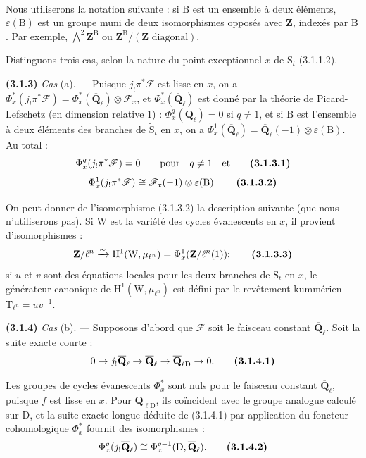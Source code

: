 \documentclass[11pt,leqno]{article}
\newcommand{\Page}[1]{\ifvmode\noindent\else\unskip\ \fi{\footnotesize\textcolor{gray}{[p.\,#1]}}\ \ignorespaces}
\begin{document}
\Page{199}

Nous utiliserons la notation suivante : si \(\mathrm B\) est un ensemble à deux éléments, \(\varepsilon(\mathrm B)\) est un groupe muni de deux isomorphismes opposés avec \(\mathbf Z\), indexés par \(\mathrm B\). Par exemple, \(\bigwedge\limits^{2}\mathbf Z^{\mathrm B}\) ou \(\mathbf Z^{\mathrm B}/(\mathbf Z\text{ diagonal})\).

Distinguons trois cas, selon la nature du point exceptionnel \(x\) de \(\mathrm S_t\) (3.1.1.2).

\textbf{(3.1.3)} \textit{Cas} (a). — Puisque \(j_!\pi^*\mathscr F\) est lisse en \(x\), on a \(\Phi_x^*(j_!\pi^*\mathscr F)=\Phi_x^*(\overline{\mathbf Q}_\ell)\otimes\mathscr F_x\), et \(\Phi_x^*(\overline{\mathbf Q}_\ell)\) est donné par la théorie de Picard-Lefschetz (en dimension relative \(1\)) : \(\Phi_x^q(\overline{\mathbf Q}_\ell)=0\) si \(q\ne1\), et si \(\mathrm B\) est l’ensemble à deux éléments des branches de \(\widetilde{\mathrm S}_t\) en \(x\), on a \(\Phi_x^1(\overline{\mathbf Q}_\ell)=\overline{\mathbf Q}_\ell(-1)\otimes\varepsilon(\mathrm B)\). Au total :
\[
\Phi_x^q(j_!\pi^*\mathscr F)=0
\qquad\text{pour}\quad q\ne1
\quad\text{et}
\tag*{\textbf{(3.1.3.1)}}
\]
\[
\Phi_x^1(j_!\pi^*\mathscr F)
\cong\mathscr F_x(-1)\otimes\varepsilon(\mathrm B).
\tag*{\textbf{(3.1.3.2)}}
\]

On peut donner de l’isomorphisme (3.1.3.2) la description suivante (que nous n’utiliserons pas). Si \(\mathrm W\) est la variété des cycles évanescents en \(x\), il provient d’isomorphismes :
\[
\mathbf Z/\ell^n
\xrightarrow{\sim}
\mathrm H^1(\mathrm W,\mu_{\ell^n})
=\Phi_x^1(\mathbf Z/\ell^n(1));
\tag*{\textbf{(3.1.3.3)}}
\]
si \(u\) et \(v\) sont des équations locales pour les deux branches de \(\mathrm S_t\) en \(x\), le générateur canonique de \(\mathrm H^1(\mathrm W,\mu_{\ell^n})\) est défini par le revêtement kummérien \(\mathrm T_{\ell^n}=uv^{-1}\).

\textbf{(3.1.4)} \textit{Cas} (b). — Supposons d’abord que \(\mathscr F\) soit le faisceau constant \(\overline{\mathbf Q}_\ell\). Soit la suite exacte courte :
\[
0\to j_!\overline{\mathbf Q}_\ell
\to\overline{\mathbf Q}_\ell
\to\overline{\mathbf Q}_{\ell\mathrm D}\to0.
\tag*{\textbf{(3.1.4.1)}}
\]

Les groupes de cycles évanescents \(\Phi_x^*\) sont nuls pour le faisceau constant \(\overline{\mathbf Q}_\ell\), puisque \(f\) est lisse en \(x\). Pour \(\overline{\mathbf Q}_{\ell\mathrm D}\), ils coïncident avec le groupe analogue calculé sur \(\mathrm D\), et la suite exacte longue déduite de (3.1.4.1) par application du foncteur cohomologique \(\Phi_x^*\) fournit des isomorphismes :
\[
\Phi_x^q(j_!\overline{\mathbf Q}_\ell)
\cong\Phi_x^{q-1}(\mathrm D,\overline{\mathbf Q}_\ell).
\tag*{\textbf{(3.1.4.2)}}
\]
\end{document}
